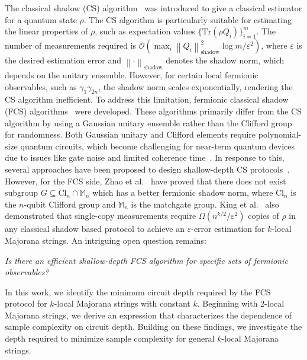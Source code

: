 \documentclass[showpacs,twocolumn,aps,prx,long bibliography,superscriptaddress,notitlepage]{revtex4-1}
\newcommand{\vabs}[1]{\left\| #1 \right\|}
\newcommand{\cbra}[1]{\{ #1 \}}
\newcommand{\pbra}[1]{\left( #1 \right)}
\newcommand{\tra}[1]{\text{Tr}\left( #1 \right)}
\newcommand{\Ord}[1]{\mathcal{O}\left( #1 \right)}
\newcommand{\Mbb}{\mathbb{M}}
\begin{document}
The classical shadow (CS) algorithm~\cite{huang2020predicting} was introduced to give a classical estimator for a quantum state $\rho$. The CS algorithm is particularly suitable for estimating the linear properties of $\rho$, such as expectation values $\cbra{\tra{\rho Q_i}}_{i=1}^m$. The number of measurements required is $\Ord{\max_i \vabs{Q_i}^2_{\text{shadow}} \log m / \varepsilon^2}$, where $\varepsilon$ is the desired estimation error and $\vabs{\cdot}_{\text{shadow}}$ denotes the shadow norm, which depends on the unitary ensemble. 
However, for certain local fermionic observables, such as $\gamma_1\gamma_{2n}$, the shadow norm scales exponentially, rendering the CS algorithm inefficient. 
To address this limitation, fermionic classical shadow (FCS) algorithms~\cite{bonet2020nearly, Zhao21Fermionic, low2022classical, wan2022matchgate, zhao2024group,heyraud2024unified} were developed. These algorithms primarily differ from the CS algorithm by using a Gaussian unitary ensemble rather than the Clifford group for randomness. Both Gaussian unitary and Clifford elements require polynomial-size quantum circuits, which become challenging for near-term quantum devices due to issues like gate noise and limited coherence time~\cite{patel2008optimal, jiang2020optimal, jiang2018quantum, arute2019quantum, Wu21Strong, cao2023generation}. In response to this, several approaches have been proposed to design shallow-depth CS protocols~\cite{bertoni2024shallow, schuster2024random, rozon2024optimal,ma2024construct}. However, for the FCS side,
Zhao et al.~\cite{Zhao21Fermionic} have proved that there does not exist subgroup $G\subseteq \text{Cl}_n \cap \Mbb_n$ which has a better fermionic shadow norm, where Cl$_n$ is the $n$-qubit Clifford group and $\Mbb_n$ is the matchgate group.  
King et al.~\cite{king2024triply} also demonstrated that single-copy measurements require $\Omega\pbra{n^{k/2}/\varepsilon^2}$ copies of $\rho$ in any classical shadow based protocol to achieve an $\varepsilon$-error estimation for $k$-local Majorana strings. 
An intriguing open question remains:
\begin{center}
  \textit{Is there an efficient shallow-depth FCS algorithm for specific sets of fermionic observables?}  
\end{center}




In this work, we identify the minimum circuit depth required by the FCS protocol for $k$-local Majorana strings with constant $k$.
 Beginning with 2-local Majorana strings, we derive an expression that characterizes the dependence of sample complexity on circuit depth. Building on these findings, we investigate the depth required to minimize sample complexity for general $k$-local Majorana strings.
\end{document}
